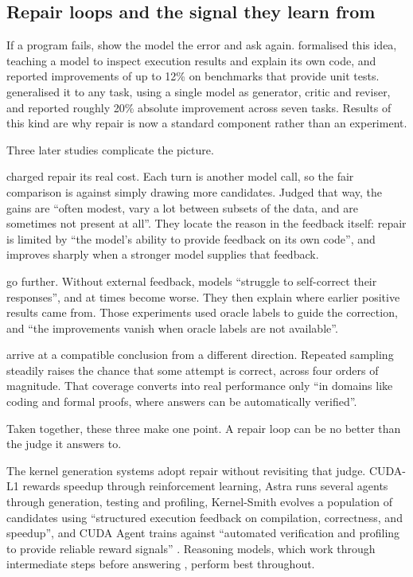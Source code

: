 \documentclass[12pt]{article}
\begin{document}
\subsection{Repair loops and the signal they learn from}
\label{sec:repair}

If a program fails, show the model the error and ask again.
\citet{chen2024selfdebug} formalised this idea, teaching a model to inspect
execution results and explain its own code, and reported improvements of up to
12\% on benchmarks that provide unit tests. \citet{madaan2023selfrefine}
generalised it to any task, using a single model as generator, critic and
reviser, and reported roughly 20\% absolute improvement across seven tasks.
Results of this kind are why repair is now a standard component rather than an
experiment.

Three later studies complicate the picture.

\citet{olausson2024selfrepair} charged repair its real cost. Each turn is
another model call, so the fair comparison is against simply drawing more
candidates. Judged that way, the gains are ``often modest, vary a lot between
subsets of the data, and are sometimes not present at all''. They locate the
reason in the feedback itself: repair is limited by ``the model's ability to
provide feedback on its own code'', and improves sharply when a stronger model
supplies that feedback.

\citet{huang2024cannot} go further. Without external feedback, models
``struggle to self-correct their responses'', and at times become worse. They
then explain where earlier positive results came from. Those experiments used
oracle labels to guide the correction, and ``the improvements vanish when
oracle labels are not available''.

\citet{brown2024monkeys} arrive at a compatible conclusion from a different
direction. Repeated sampling steadily raises the chance that some attempt is
correct, across four orders of magnitude. That coverage converts into real
performance only ``in domains like coding and formal proofs, where answers can
be automatically verified''.

Taken together, these three make one point. A repair loop can be no better than
the judge it answers to.

The kernel generation systems adopt repair without revisiting that judge.
CUDA-L1 rewards speedup through reinforcement learning, Astra runs several
agents through generation, testing and profiling, Kernel-Smith evolves a
population of candidates using ``structured execution feedback on compilation,
correctness, and speedup'', and CUDA Agent trains against ``automated
verification and profiling to provide reliable reward signals''
\citep{li2026cudal1, wei2025astra, cao2026ksearch, du2026kernelsmith,
dai2026cudaagent, chen2025cudallm}. Reasoning models, which work through
intermediate steps before answering \citep{wei2022cot}, perform best throughout.
\end{document}
